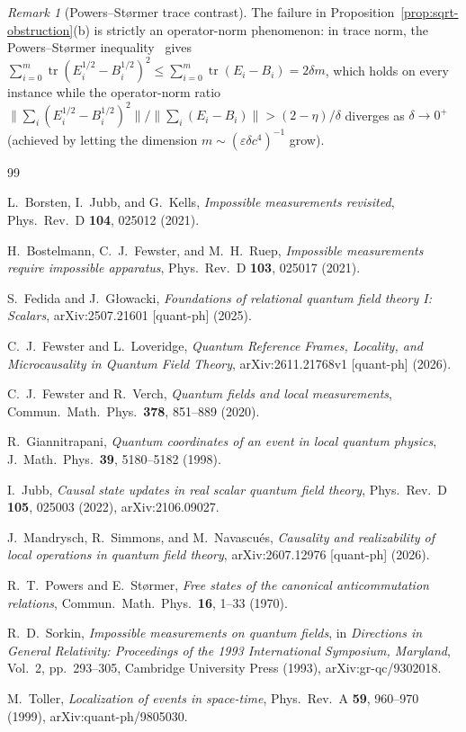 \documentclass[11pt,a4paper]{article}
\theoremstyle{definition}
\theoremstyle{remark}
\newtheorem{remark}[theorem]{Remark}
\newcommand{\tr}{\operatorname{tr}}
\newcommand{\norm}[1]{\|#1\|}
\begin{document}
\begin{remark}[Powers--St\o rmer trace contrast]\label{rem:powers-stormer}
The failure in Proposition~\ref{prop:sqrt-obstruction}(b) is strictly an operator-norm phenomenon: in trace norm, the Powers--St\o rmer inequality~\cite{PowersStormer1970} gives $\sum_{i=0}^m \tr(E_i^{1/2} - B_i^{1/2})^2 \le \sum_{i=0}^m \tr(E_i - B_i) = 2\delta m$, which holds on every instance while the operator-norm ratio $\norm{\sum_i(E_i^{1/2}-B_i^{1/2})^2}/\norm{\sum_i(E_i-B_i)} > (2-\eta)/\delta$ diverges as $\delta\to 0^+$ (achieved by letting the dimension $m\sim (\varepsilon\delta c^4)^{-1}$ grow).
\end{remark}

\begin{thebibliography}{99}

L.~Borsten, I.~Jubb, and G.~Kells,
\emph{Impossible measurements revisited},
Phys.\ Rev.\ D \textbf{104}, 025012 (2021).

H.~Bostelmann, C.~J.~Fewster, and M.~H.~Ruep,
\emph{Impossible measurements require impossible apparatus},
Phys.\ Rev.\ D \textbf{103}, 025017 (2021).

S.~Fedida and J.~G\l owacki,
\emph{Foundations of relational quantum field theory {I}: {S}calars},
arXiv:2507.21601 [quant-ph] (2025).

C.~J.~Fewster and L.~Loveridge,
\emph{Quantum Reference Frames, Locality, and Microcausality in Quantum Field Theory},
arXiv:2611.21768v1 [quant-ph] (2026).

C.~J.~Fewster and R.~Verch,
\emph{Quantum fields and local measurements},
Commun.\ Math.\ Phys.\ \textbf{378}, 851--889 (2020).

R.~Giannitrapani,
\emph{Quantum coordinates of an event in local quantum physics},
J.\ Math.\ Phys.\ \textbf{39}, 5180--5182 (1998).

I.~Jubb,
\emph{Causal state updates in real scalar quantum field theory},
Phys.\ Rev.\ D \textbf{105}, 025003 (2022), arXiv:2106.09027.

J.~Mandrysch, R.~Simmons, and M.~Navascu\'es,
\emph{Causality and realizability of local operations in quantum field theory},
arXiv:2607.12976 [quant-ph] (2026).

R.~T.~Powers and E.~St\o rmer,
\emph{Free states of the canonical anticommutation relations},
Commun.\ Math.\ Phys.\ \textbf{16}, 1--33 (1970).

R.~D.~Sorkin,
\emph{Impossible measurements on quantum fields},
in \emph{Directions in General Relativity: Proceedings of the 1993 International Symposium, Maryland}, Vol.~2, pp.~293--305, Cambridge University Press (1993), arXiv:gr-qc/9302018.

M.~Toller,
\emph{Localization of events in space-time},
Phys.\ Rev.\ A \textbf{59}, 960--970 (1999), arXiv:quant-ph/9805030.

\end{thebibliography}
\end{document}
